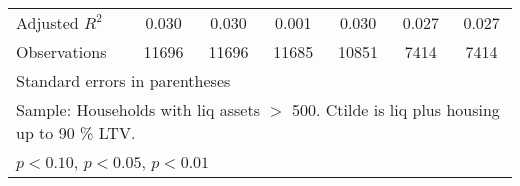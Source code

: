{\begin{longtable}{l*{6}{c}}
Adjusted \(R^{2}\)  &       0.030         &       0.030         &       0.001         &       0.030         &       0.027         &       0.027         \\
Observations        &       11696         &       11696         &       11685         &       10851         &        7414         &        7414         \\
\bottomrule
\multicolumn{7}{l}{\footnotesize Standard errors in parentheses}\\
\multicolumn{7}{l}{\footnotesize Sample: Households with liq assets $>$ 500. Ctilde is liq plus housing up to 90 \% LTV.}\\
\multicolumn{7}{l}{\footnotesize \sym{*} \(p<0.10\), \sym{**} \(p<0.05\), \sym{***} \(p<0.01\)}\\
\end{longtable}
}
